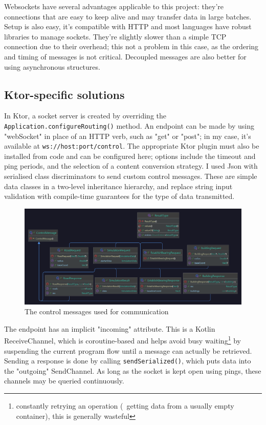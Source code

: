 Websockets have several advantages applicable to this project: they're connections that are easy to keep alive and may transfer data in large batches. Setup is also easy, it's compatible with HTTP and most languages have robust libraries to manage sockets. They're slightly slower than a simple TCP connection due to their overhead; this not a problem in this case, as the ordering and timing of messages is not critical. Decoupled messages are also better for using asynchronous structures.

\subsection{Ktor-specific solutions}

In Ktor, a socket server is created by overriding the \verb|Application.configureRouting()| method. An endpoint can be made by using "webSocket" in place of an HTTP verb, such as "get" or "post"; in my case, it's available at \verb|ws://host:port/control|. The appropriate Ktor plugin must also be installed from code and can be configured here; options include the timeout and ping periods, and the selection of a content conversion strategy. I used Json with serialised class discriminators to send custom control messages. These are simple data classes in a two-level inheritance hierarchy, and replace string input validation with compile-time guarantees for the type of data transmitted.

\label{control-msg}
\begin{figure}[!ht]
    \centering
    \includegraphics[width=140mm, keepaspectratio]{images/control-messages.png}
    \caption{The control messages used for communication}
\end{figure}

The endpoint has an implicit "incoming" attribute. This is a Kotlin ReceiveChannel, which is coroutine-based and helps avoid busy waiting\footnote{constantly retrying an operation (\eg~getting data from a usually empty container), this is generally wasteful} by suspending the current program flow until a message can actually be retrieved. Sending a response is done by calling \verb|sendSerialized()|, which puts data into the "outgoing" SendChannel. As long as the socket is kept open using pings, these channels may be queried continuously.

